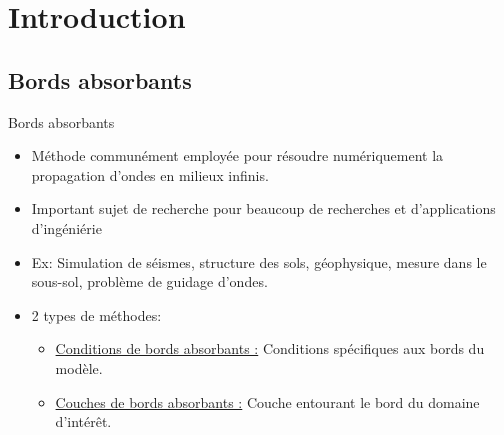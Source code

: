 \section{Introduction}
\subsection{Bords absorbants}
\begin{frame}{Bords absorbants}
    \begin{itemize}[<+->]
        \item Méthode communément employée pour résoudre numériquement la propagation d'ondes en milieux infinis.
        \item Important sujet de recherche pour beaucoup de recherches et d'applications d'ingéniérie
        \item Ex: Simulation de séismes, structure des sols, géophysique, mesure dans le sous-sol, problème de guidage d'ondes.        \pause
        \vspace{0.7cm}
        \item 2 types de méthodes:
        \begin{itemize}[<+->]
        \pause
            \item \underline{Conditions de bords absorbants :} Conditions spécifiques aux bords du modèle.
        \pause
            \item \underline{Couches de bords absorbants :} Couche entourant le bord du domaine d'intérêt.
        \end{itemize}    
    \end{itemize}
\end{frame}

